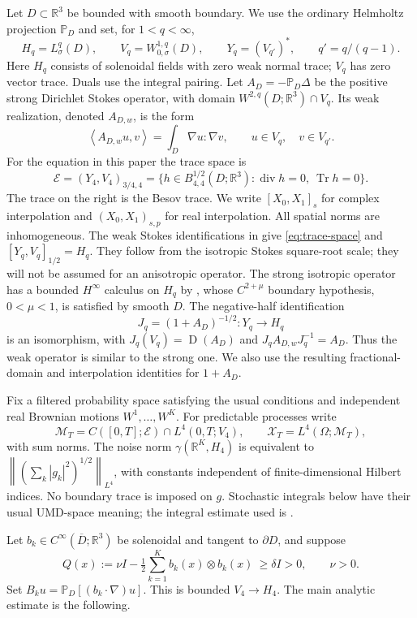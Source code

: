 \documentclass[11pt]{article}
\numberwithin{equation}{section}
\theoremstyle{remark}
\newcommand{\R}{\mathbb R}
\newcommand{\PP}{\mathbb P}
\newcommand{\Tr}{\operatorname{Tr}}
\newcommand{\divg}{\operatorname{div}}
\newcommand{\calE}{\mathcal E}
\newcommand{\calX}{\mathcal X}
\newcommand{\calM}{\mathcal M}
\newcommand{\norm}[1]{\left\lVert#1\right\rVert}
\newcommand{\ip}[2]{\left\langle#1,#2\right\rangle}
\DeclareMathOperator{\Dom}{D}
\begin{document}
Let $D\subset\R^3$ be bounded with smooth boundary. We use the ordinary
Helmholtz projection $\PP_D$ and set, for $1<q<\infty$,
\[
 H_q=L^q_\sigma(D),\qquad V_q=W^{1,q}_{0,\sigma}(D),
 \qquad Y_q=(V_{q'})^*,\qquad q'=q/(q-1).
\]
Here $H_q$ consists of solenoidal fields with zero weak normal trace;
$V_q$ has zero vector trace. Duals use the integral pairing. Let
$A_D=-\PP_D\Delta$ be the positive strong Dirichlet Stokes operator,
with domain $W^{2,q}(D;\R^3)\cap V_q$. Its weak realization, denoted
$A_{D,w}$, is the form
\begin{equation}\label{eq:weak-stokes}
 \ip{A_{D,w}u}{v}=\int_D\nabla u:\nabla v,
 \qquad u\in V_q,\quad v\in V_{q'}.
\end{equation}
For the equation in this paper the trace space is
\begin{equation}\label{eq:trace-space}
 \calE=(Y_4,V_4)_{3/4,4}
 =\{h\in B^{1/2}_{4,4}(D;\R^3):\divg h=0,\ \Tr h=0\}.
\end{equation}
The trace on the right is the Besov trace. We write $[X_0,X_1]_s$
for complex interpolation and $(X_0,X_1)_{s,p}$ for real interpolation.
All spatial norms are inhomogeneous. The weak Stokes identifications in
\cite[Section 5, Proposition 5.1]{PW} give \eqref{eq:trace-space} and
$[Y_q,V_q]_{1/2}=H_q$. They follow from the isotropic Stokes
square-root scale; they will not be assumed for an anisotropic operator.
The strong isotropic operator has a bounded $H^\infty$ calculus on
$H_q$ by \cite[Theorem 2.1]{KWErratum}, whose $C^{2+\mu}$ boundary hypothesis, $0<\mu<1$, is satisfied by smooth $D$. The negative-half identification
\[
 J_q=(1+A_D)^{-1/2}:Y_q\longrightarrow H_q
\]
is an isomorphism, with $J_q(V_q)=\Dom(A_D)$ and
$J_qA_{D,w}J_q^{-1}=A_D$. Thus the weak operator is similar to the
strong one. We also use the resulting fractional-domain and
interpolation identities for $1+A_D$.

Fix a filtered probability space satisfying the usual conditions and
independent real Brownian motions $W^1,\ldots,W^K$. For predictable
processes write
\[
 \calM_T=C([0,T];\calE)\cap L^4(0,T;V_4),\qquad
 \calX_T=L^4(\Omega;\calM_T),
\]
with sum norms. The noise norm $\gamma(\R^K,H_4)$ is equivalent to
$\norm{(\sum_k|g_k|^2)^{1/2}}_{L^4}$, with constants independent of
finite-dimensional Hilbert indices. No boundary trace is imposed on $g$.
Stochastic integrals below have their usual UMD-space meaning; the
integral estimate used is \cite[Proposition 2.4]{AV}.

Let $b_k\in C^\infty(\overline D;\R^3)$ be solenoidal and tangent to
$\partial D$, and suppose
\begin{equation}\label{eq:parabolicity}
 Q(x):=\nu I-\tfrac12\sum_{k=1}^K b_k(x)\otimes b_k(x)
 \ \geq\delta I>0,\qquad \nu>0.
\end{equation}
Set $B_ku=\PP_D[(b_k\cdot\nabla)u]$. This is bounded
$V_4\to H_4$. The main analytic estimate is the following.
\end{document}
